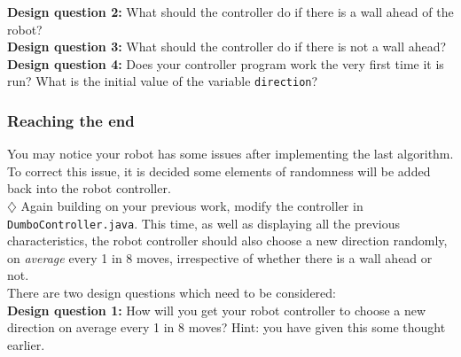 \noindent
{\bf Design question 2:}
What should the controller do if there is a wall ahead of the robot? \\

\noindent
{\bf Design question 3:}
What should the controller do if there is not a wall ahead? \\

\noindent
{\bf Design question 4:}
Does your controller program work the very first time it is run? What is the
initial value of the variable {\tt direction}?


\subsubsection{Reaching the end}

You may notice your robot has some issues after implementing the last algorithm.
To correct this issue, it is decided some elements of randomness will be added
back into the robot controller. \\

\noindent $\diamondsuit$ 
Again building on your previous work, modify the controller
in {\tt DumboController.java}. This time, as
well as displaying all the previous characteristics, the robot controller 
should also choose a new direction randomly, on \emph{average} every 1 in 8 moves,
irrespective of whether there is a wall ahead or not. \\

\noindent
There are two design questions which need to be considered: \\

\noindent
{\bf Design question 1:}
How will you get your robot controller to choose a new direction on
average every 1 in 8 moves? Hint: you have given this some thought earlier. \\

